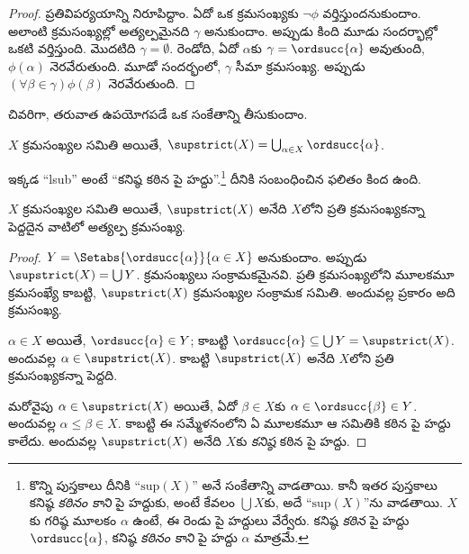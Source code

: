 \documentclass[../../../include/open-logic-section]{subfiles}
\begin{document}
\begin{proof}
ప్రతివిపర్యయాన్ని నిరూపిద్దాం. ఏదో ఒక క్రమసంఖ్యకు
$\lnot\phi$ వర్తిస్తుందనుకుందాం.
అలాంటి క్రమసంఖ్యల్లో అత్యల్పమైనది $\gamma$ అనుకుందాం.
అప్పుడు కింది మూడు సందర్భాల్లో ఒకటి వర్తిస్తుంది.
మొదటిది $\gamma = \emptyset$. రెండోది, ఏదో $\alpha$కు
$\gamma = \ordsucc{\alpha}$ అవుతుంది, $\phi(\alpha)$ నెరవేరుతుంది.
మూడో సందర్భంలో, $\gamma$ సీమా క్రమసంఖ్య.
అప్పుడు
$(\forall \beta \in \gamma)\phi(\beta)$ నెరవేరుతుంది.
\end{proof}
\noindent
చివరిగా, తరువాత
ఉపయోగపడే ఒక సంకేతాన్ని తీసుకుందాం.

\begin{defn}
$X$ క్రమసంఖ్యల
సమితి అయితే,
$\supstrict(X) = \bigcup_{\alpha
\in X} \ordsucc{\alpha}$.
\end{defn}
\noindent
ఇక్కడ ``lsub'' అంటే
``కనిష్ఠ కఠిన పై హద్దు''.\footnote{కొన్ని
పుస్తకాలు దీనికి
``$\text{sup}(X)$''
అనే సంకేతాన్ని వాడతాయి.
కానీ ఇతర పుస్తకాలు
కనిష్ఠ \emph{కఠినం కాని}
పై హద్దుకు, అంటే కేవలం
$\bigcup X$కు, అదే
``$\text{sup}(X)$''ను
వాడతాయి. $X$కు
గరిష్ఠ మూలకం $\alpha$
ఉంటే, ఈ రెండు పై హద్దులు వేర్వేరు.
కనిష్ఠ \emph{కఠిన} పై హద్దు $\ordsucc{\alpha}$,
కనిష్ఠ \emph{కఠినం కాని} పై హద్దు $\alpha$ మాత్రమే.}
దీనికి సంబంధించిన ఫలితం కింద ఉంది.

\begin{prop}
$X$ క్రమసంఖ్యల సమితి అయితే, $\supstrict(X)$ అనేది
$X$లోని ప్రతి క్రమసంఖ్యకన్నా పెద్దదైన వాటిలో అత్యల్ప క్రమసంఖ్య.
\end{prop}

\begin{proof}
$Y = \Setabs{\ordsucc{\alpha}}{\alpha \in X}$
అనుకుందాం. అప్పుడు
$\supstrict(X) = \bigcup Y$.
క్రమసంఖ్యలు సంక్రామకమైనవి.
ప్రతి క్రమసంఖ్యలోని
మూలకమూ క్రమసంఖ్యే
కాబట్టి, $\supstrict(X)$
క్రమసంఖ్యల సంక్రామక
సమితి. అందువల్ల
ప్రకారం అది
క్రమసంఖ్య.

$\alpha \in X$ అయితే,
$\ordsucc{\alpha} \in Y$;
కాబట్టి $\ordsucc{\alpha}
\subseteq \bigcup Y = \supstrict(X)$.
అందువల్ల $\alpha \in
\supstrict(X)$. కాబట్టి $\supstrict(X)$ అనేది $X$లోని ప్రతి క్రమసంఖ్యకన్నా పెద్దది.

మరోవైపు $\alpha \in \supstrict(X)$ అయితే, ఏదో
$\beta \in X$కు $\alpha \in \ordsucc{\beta} \in Y$.
అందువల్ల $\alpha \leq \beta \in X$. కాబట్టి ఈ సమ్మేళనంలోని
ఏ మూలకమూ ఆ సమితికి కఠిన పై హద్దు కాలేదు. అందువల్ల
$\supstrict(X)$ అనేది $X$కు \emph{కనిష్ఠ} కఠిన పై హద్దు.
\end{proof}
\end{document}
